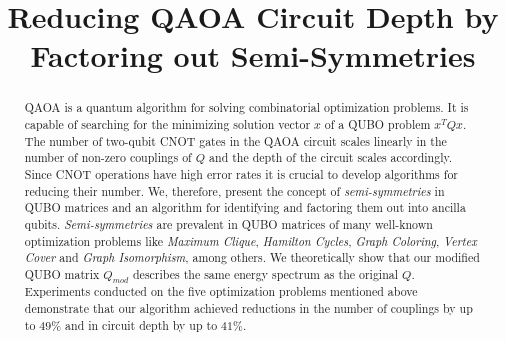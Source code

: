 \documentclass[conference]{IEEEtran}
\theoremstyle{plain}
\theoremstyle{definition}
\theoremstyle{remark}
\begin{document}
\title{Reducing QAOA Circuit Depth by Factoring out Semi-Symmetries}

\author{
\and
{}
\and
{}
\and
{}
\and
{}
\and
{}
\and
{}
}

\maketitle

\begin{abstract}

QAOA is a quantum algorithm for solving combinatorial optimization problems. It is capable of searching for the minimizing solution vector $x$ of a QUBO problem $x^TQx$. The number of two-qubit CNOT gates in the QAOA circuit scales linearly in the number of non-zero couplings of $Q$ and the depth of the circuit scales accordingly. Since CNOT operations have high error rates it is crucial to develop algorithms for reducing their number. We, therefore, present the concept of \textit{semi-symmetries} in QUBO matrices and an algorithm for identifying and factoring them out into ancilla qubits. \textit{Semi-symmetries} are prevalent in QUBO matrices of many well-known optimization problems like \textit{Maximum Clique}, \textit{Hamilton Cycles}, \textit{Graph Coloring}, \textit{Vertex Cover} and \textit{Graph Isomorphism}, among others. We theoretically show that our modified QUBO matrix $Q_{mod}$ describes the same energy spectrum as the original $Q$. Experiments conducted on the five optimization problems mentioned above demonstrate that our algorithm achieved reductions in the number of couplings by up to $49\%$ and in circuit depth by up to $41\%$.

\end{abstract}
\end{document}
